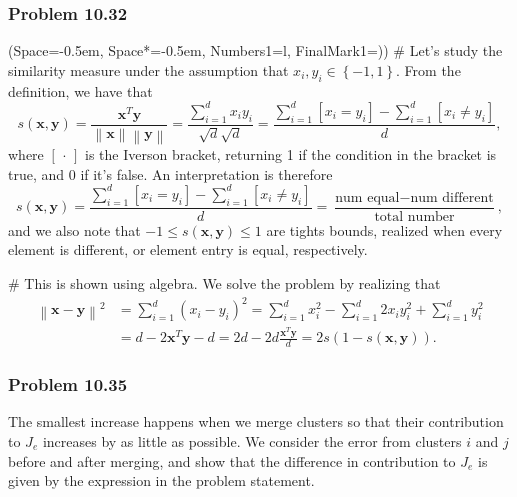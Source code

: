\documentclass[12pt, a4paper]{article}
\newcommand{\listSpace}{-0.5em}%
\newcommand{\vect}[1]{\bm{#1}}
\newcommand{\norm}[1]{\left\lVert#1\right\rVert}
\begin{document}
{\subsubsection*{Problem 10.32}
\begin{easylist}[enumerate]
\ListProperties(Space=\listSpace, Space*=\listSpace, Numbers1=l, FinalMark1={)})
# 
Let's study the similarity measure under the assumption that $x_i, y_i \in \left\{-1, 1\right\}$.
From the definition, we have that
\begin{equation*}
	s(\vect{x}, \vect{y}) = \frac{\vect{x}^T \vect{y}}{\norm{\vect{x}} \norm{\vect{y}}}
	=
	\frac{\sum_{i=1}^{d} x_i y_i}{\sqrt{d} \sqrt{d}}
	=
	\frac{\sum_{i=1}^{d} \left[ x_i = y_i \right] - \sum_{i=1}^{d} \left[ x_i \neq y_i \right]}{d},
\end{equation*}
where $\left[ \, \cdot \,  \right]$ is the Iverson bracket, returning 1 if the condition in the bracket is true, and 0 if it's false.
An interpretation is therefore
\begin{equation*}
s(\vect{x}, \vect{y}) 
= 
\frac{\sum_{i=1}^{d} \left[ x_i = y_i \right] - \sum_{i=1}^{d} \left[ x_i \neq y_i \right]}{d}
= \frac{\text{num equal} - \text{num different}}{\text{total number}},
\end{equation*}
and we also note that $-1 \leq s(\vect{x}, \vect{y})  \leq 1 $ are tights bounds, realized when every element is different, or element entry is equal, respectively.

# This is shown using algebra.
We solve the problem by realizing that
\begin{align*}
	\norm{\vect{x} - \vect{y}}^2 &= \sum_{i=1}^{d} (x_i - y_i)^2 =
	\sum_{i=1}^{d} x_i^2 
	-
	\sum_{i=1}^{d} 2x_i y_i^2
	+ 
	\sum_{i=1}^{d}  y_i^2 \\
	&= d - 2 \vect{x}^T \vect{y} -d = 2d - 2d \frac{\vect{x}^T \vect{y}}{d}
	= 2s (1 - s(\vect{x}, \vect{y}) ).
\end{align*}
\end{easylist}


\subsubsection*{Problem 10.35}
The smallest increase happens when we merge clusters so that their contribution to $J_e$ increases by as little as possible.
We consider the error from clusters $i$ and $j$ before and after merging, and show that the difference in contribution to $J_e$ is given by the expression in the problem statement.

}
\end{document}
